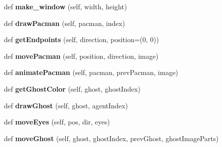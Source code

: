 \begin{DoxyCompactItemize}
def {\bfseries make\+\_\+window} (self, width, height)
\item 
\mbox{\label{classgraphics_display_1_1_pacman_graphics_a2d3c8792a0f373190d40d093ba8d2955}} 
def {\bfseries draw\+Pacman} (self, pacman, index)
\item 
\mbox{\label{classgraphics_display_1_1_pacman_graphics_a4b717eafb23f242ddedaa795471c3253}} 
def {\bfseries get\+Endpoints} (self, direction, position=(0, 0))
\item 
\mbox{\label{classgraphics_display_1_1_pacman_graphics_a35e2df6f62735a6a38111524af7bede1}} 
def {\bfseries move\+Pacman} (self, position, direction, image)
\item 
\mbox{\label{classgraphics_display_1_1_pacman_graphics_a3c5c3ac8fa716a1cecda0aa719ec907e}} 
def {\bfseries animate\+Pacman} (self, pacman, prev\+Pacman, image)
\item 
\mbox{\label{classgraphics_display_1_1_pacman_graphics_aa1ba3d9e8c9121cc94a77a51c3cfe439}} 
def {\bfseries get\+Ghost\+Color} (self, ghost, ghost\+Index)
\item 
\mbox{\label{classgraphics_display_1_1_pacman_graphics_a5ae92dd9a341e486aca20e5e66e0030d}} 
def {\bfseries draw\+Ghost} (self, ghost, agent\+Index)
\item 
\mbox{\label{classgraphics_display_1_1_pacman_graphics_aa07a9f6bf3c41431c373f8b6d84bc7d4}} 
def {\bfseries move\+Eyes} (self, pos, dir, eyes)
\item 
\mbox{\label{classgraphics_display_1_1_pacman_graphics_a0ed205d5b7f9f1b0813c944f8ac7ebc0}} 
def {\bfseries move\+Ghost} (self, ghost, ghost\+Index, prev\+Ghost, ghost\+Image\+Parts)
\item 
\mbox{\label{classgraphics_display_1_1_pacman_graphics_a00aca399e2ac5c297c03e008046f3e24}} 

\end{DoxyCompactItemize}
